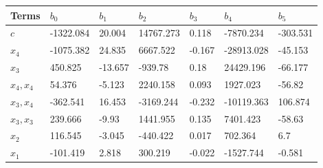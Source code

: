 \begin{tabular}{lllllll}
Terms & $b_0$ & $b_1$ & $b_2$ & $b_3$ & $b_4$ & $b_5$ \\ 
\hline 
$c$ & -1322.084 & 20.004 & 14767.273 & 0.118 & -7870.234 & -303.531 \\ 
$x_4$ & -1075.382 & 24.835 & 6667.522 & -0.167 & -28913.028 & -45.153 \\ 
$x_3$ & 450.825 & -13.657 & -939.78 & 0.18 & 24429.196 & -66.177 \\ 
$x_4,x_4$ & 54.376 & -5.123 & 2240.158 & 0.093 & 1927.023 & -56.82 \\ 
$x_3,x_4$ & -362.541 & 16.453 & -3169.244 & -0.232 & -10119.363 & 106.874 \\ 
$x_3,x_3$ & 239.666 & -9.93 & 1441.955 & 0.135 & 7401.423 & -58.63 \\ 
$x_2$ & 116.545 & -3.045 & -440.422 & 0.017 & 702.364 & 6.7 \\ 
$x_1$ & -101.419 & 2.818 & 300.219 & -0.022 & -1527.744 & -0.581 \\ 
\hline 
\end{tabular}